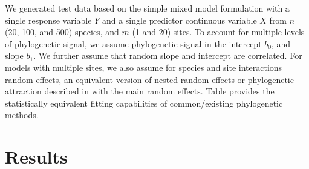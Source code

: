 We generated test data based on the simple mixed model formulation  with a single response variable $Y$ and a single predictor continuous variable $X$ from $n$ (20, 100, and 500) species, and $m$ (1 and 20) sites. 
To account for multiple levels of phylogenetic signal, we assume phylogenetic signal in the intercept $b_0$, and slope $b_1$.
We further assume that random slope and intercept are correlated. 
For models with multiple sites, we also assume for species and site interactions random effects, an equivalent version of nested random effects or phylogenetic attraction described in \cite{helmus2007separating} with the main random effects.
Table  provides the statistically equivalent fitting capabilities of common/existing phylogenetic methods.

% 
% 

\section{Results}

